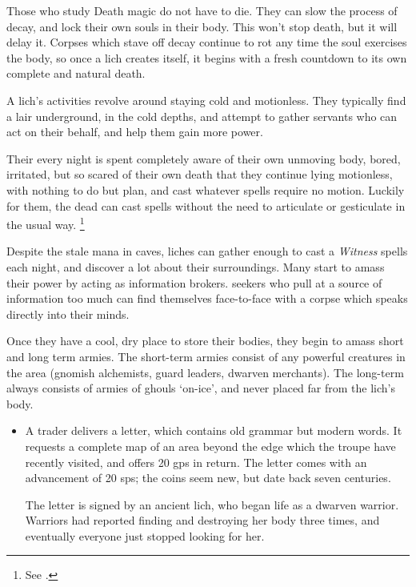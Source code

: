 \begin{multicols}{2}

\noindent
Those who study Death magic do not have to die.
They can slow the process of decay, and lock their own souls in their body.
This won't stop death, but it will delay it.
Corpses which stave off decay continue to rot any time the soul exercises the body, so once a lich creates itself, it begins with a fresh countdown to its own complete and natural death.

A lich's activities revolve around staying cold and motionless.
They typically find a lair underground, in the cold depths, and attempt to gather servants who can act on their behalf, and help them gain more power.

Their every night is spent completely aware of their own unmoving body, bored, irritated, but so scared of their own death that they continue lying motionless, with nothing to do but plan, and cast whatever spells require no motion.
Luckily for them, the dead can cast spells without the need to articulate or gesticulate in the usual way.%
\footnote{See .}

Despite the stale mana in caves, liches can gather enough to cast a \textit{Witness} spells each night, and discover a lot about their surroundings.
Many start to amass their power by acting as information brokers.
\Glspl{seeker} who pull at a source of information too much can find themselves face-to-face with a corpse which speaks directly into their minds.

\lich

Once they have a cool, dry place to store their bodies, they begin to amass short and long term armies.
The short-term armies consist of any powerful creatures in the area (gnomish alchemists, \gls{guard} leaders, dwarven merchants).
The long-term always consists of armies of ghouls `on-ice', and never placed far from the lich's body.

\showStdSpells

\showEnc[D]
\begin{itemize}
  \item
  A trader delivers a letter, which contains old grammar but modern words.
  It requests a complete map of an area beyond the \gls{edge} which the troupe have recently visited, and offers 20 \glspl{gp} in return.
  The letter comes with an advancement of 20 \glspl{sp}; the coins seem new, but date back seven centuries.

  The letter is signed by an ancient lich, who began life as a dwarven warrior.
  Warriors had reported finding and destroying her body three times, and eventually everyone just stopped looking for her.


\end{itemize}
\end{multicols}
